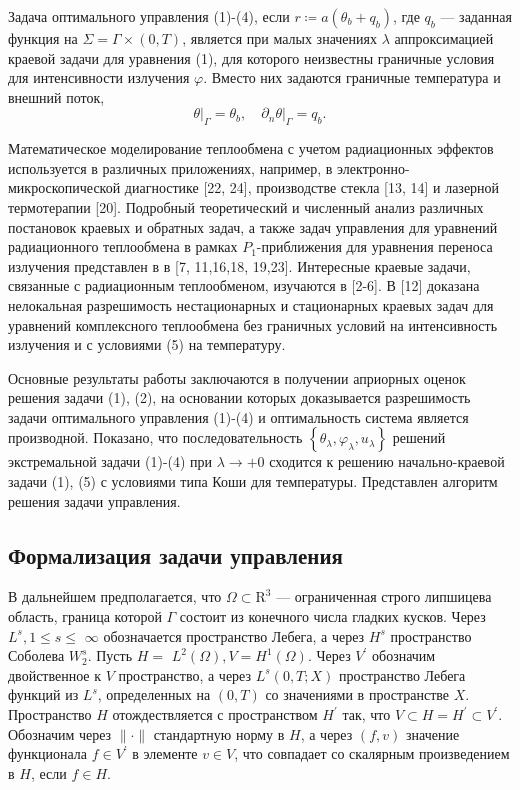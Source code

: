 Задача оптимального управления (1)-(4), если $r \coloneqq a\left(\theta_{b}+q_{b}\right)$,
где $q_{b}$ — заданная функция на $\Sigma =\Gamma \times(0, T)$,
является при малых значениях $\lambda$ аппроксимацией краевой задачи для уравнения (1),
для которого неизвестны граничные условия для интенсивности излучения $\varphi$.
Вместо них задаются граничные температура и внешний поток,
\[
\left.\theta\right|_{\Gamma}=\theta_{b},\left.\quad \partial_{n} \theta\right|_{\Gamma}=q_{b}.
\]

Математическое моделирование теплообмена с учетом радиационных эффектов используется в различных
приложениях, например, в электронно-микроскопической диагностике [22, 24],
производстве стекла [13, 14] и лазерной термотерапии [20].
Подробный теоретический и численный анализ различных постановок краевых и обратных задач,
а также задач управления для уравнений радиационного теплообмена в рамках $P_1$-приближения
для уравнения переноса излучения представлен в в [7, 11,16,18, 19,23].
Интересные краевые задачи, связанные с радиационным теплообменом,
изучаются в [2-6].
В [12] доказана нелокальная разрешимость нестационарных и стационарных
краевых задач для уравнений комплексного теплообмена без граничных
условий на интенсивность излучения и с условиями (5) на температуру.

Основные результаты работы заключаются в получении априорных оценок решения задачи (1), (2),
на основании которых доказывается разрешимость задачи оптимального управления (1)-(4)
и оптимальность система является производной.
Показано, что последовательность $\left\{\theta_{\lambda}, \varphi_{\lambda}, u_{\lambda}\right\}$
решений экстремальной задачи (1)-(4) при $ \lambda \rightarrow+0$
сходится к решению начально-краевой задачи (1), (5) с условиями типа Коши для температуры.
Представлен алгоритм решения задачи управления.

\subsection{Формализация задачи управления}\label{subsec:ch2/sec3/subsec2}
В дальнейшем предполагается, что $\Omega \subset \mathrm{R}^{3}$ — ограниченная строго липшицева область,
граница которой $\Gamma$ состоит из конечного числа гладких кусков.
Через $L^{s}, 1 \leq s \leq$ $\infty$
обозначается пространство Лебега, а через $H^{s}$ пространство Соболева $W_{2}^{s}$.
Пусть $H=$ $L^{2}(\Omega), V=H^{1}(\Omega)$.
Через $V^{\prime}$ обозначим двойственное к $V$ пространство, а через $L^{s}(0, T; X)$
пространство Лебега функций из $L^{s}$, определенных на $(0, T)$ со значениями в пространстве $X$.
Пространство $H$ отождествляется с пространством
$H^{\prime}$ так, что $V \subset H=H^{\prime} \subset V^{\prime}$.
Обозначим через $\|\cdot\|$ стандартную норму в $H$, а через $(f, v)$
значение функционала $f \in V^{\prime}$ в элементе $v \in V$,
что совпадает со скалярным произведением в $H$, если $f \in H$.

